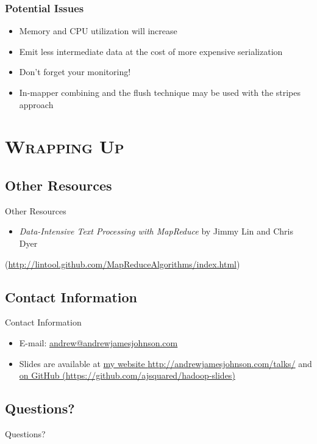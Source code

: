 \documentclass[xcolor=x11names,compress]{beamer}
\renewcommand{\(}{\begin{columns}}
\renewcommand{\)}{\end{columns}}
\newcommand{\<}[1]{\begin{column}{#1}}
\renewcommand{\>}{\end{column}}
\begin{document}
\begin{frame}
  \frametitle{Potential Issues}
  \begin{itemize}
  \item<1,2> Memory and CPU utilization will increase
  \item<2> Emit less intermediate data at the cost of more expensive serialization
  \item<3> Don't forget your monitoring!
  \item<4> In-mapper combining and the flush technique may be used
    with the stripes approach
  \end{itemize}
\end{frame}

\section{\scshape Wrapping Up}

\subsection{Other Resources}
\begin{frame}{Other Resources}
  \begin{itemize}
  \item \emph{Data-Intensive Text Processing with MapReduce} by Jimmy
    Lin and Chris Dyer
  \end{itemize}
  (\url{http://lintool.github.com/MapReduceAlgorithms/index.html})
\end{frame}

\subsection{Contact Information}
\begin{frame}{Contact Information}
  \begin{itemize}
  \item E-mail: \href{mailto:andrew@andrewjamesjohnson.com}{andrew@andrewjamesjohnson.com}
  \item Slides are available at
    \href{http://andrewjamesjohnson.com/talks/}{my website \url{http://andrewjamesjohnson.com/talks/}} and
    \href{https://github.com/ajsquared/hadoop-slides}{on GitHub (\url{https://github.com/ajsquared/hadoop-slides})}
  \end{itemize}
\end{frame}

\subsection{Questions?}
\begin{frame}
  \Huge
  Questions?
\end{frame}
\end{document}

